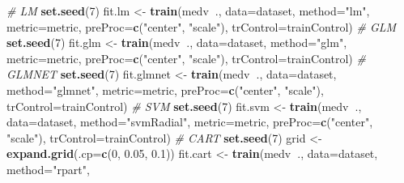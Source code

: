 \documentclass[]{book}
\newenvironment{Shaded}{\begin{snugshade}}{\end{snugshade}}
\newcommand{\CommentTok}[1]{\textcolor[rgb]{0.56,0.35,0.01}{\textit{#1}}}
\newcommand{\DataTypeTok}[1]{\textcolor[rgb]{0.13,0.29,0.53}{#1}}
\newcommand{\DecValTok}[1]{\textcolor[rgb]{0.00,0.00,0.81}{#1}}
\newcommand{\FloatTok}[1]{\textcolor[rgb]{0.00,0.00,0.81}{#1}}
\newcommand{\KeywordTok}[1]{\textcolor[rgb]{0.13,0.29,0.53}{\textbf{#1}}}
\newcommand{\NormalTok}[1]{#1}
\newcommand{\OperatorTok}[1]{\textcolor[rgb]{0.81,0.36,0.00}{\textbf{#1}}}
\newcommand{\StringTok}[1]{\textcolor[rgb]{0.31,0.60,0.02}{#1}}
\begin{document}
\begin{Shaded}
\begin{Highlighting}[]
\CommentTok{# LM}
\KeywordTok{set.seed}\NormalTok{(}\DecValTok{7}\NormalTok{)}
\NormalTok{fit.lm <-}\StringTok{ }\KeywordTok{train}\NormalTok{(medv}\OperatorTok{~}\NormalTok{., }\DataTypeTok{data=}\NormalTok{dataset, }\DataTypeTok{method=}\StringTok{"lm"}\NormalTok{, }
                \DataTypeTok{metric=}\NormalTok{metric, }\DataTypeTok{preProc=}\KeywordTok{c}\NormalTok{(}\StringTok{"center"}\NormalTok{, }\StringTok{"scale"}\NormalTok{), }
                \DataTypeTok{trControl=}\NormalTok{trainControl)}
\CommentTok{# GLM}
\KeywordTok{set.seed}\NormalTok{(}\DecValTok{7}\NormalTok{)}
\NormalTok{fit.glm <-}\StringTok{ }\KeywordTok{train}\NormalTok{(medv}\OperatorTok{~}\NormalTok{., }\DataTypeTok{data=}\NormalTok{dataset, }\DataTypeTok{method=}\StringTok{"glm"}\NormalTok{, }
                 \DataTypeTok{metric=}\NormalTok{metric, }\DataTypeTok{preProc=}\KeywordTok{c}\NormalTok{(}\StringTok{"center"}\NormalTok{, }\StringTok{"scale"}\NormalTok{), }
                 \DataTypeTok{trControl=}\NormalTok{trainControl)}
\CommentTok{# GLMNET}
\KeywordTok{set.seed}\NormalTok{(}\DecValTok{7}\NormalTok{)}
\NormalTok{fit.glmnet <-}\StringTok{ }\KeywordTok{train}\NormalTok{(medv}\OperatorTok{~}\NormalTok{., }\DataTypeTok{data=}\NormalTok{dataset, }\DataTypeTok{method=}\StringTok{"glmnet"}\NormalTok{, }
                    \DataTypeTok{metric=}\NormalTok{metric, }
                    \DataTypeTok{preProc=}\KeywordTok{c}\NormalTok{(}\StringTok{"center"}\NormalTok{, }\StringTok{"scale"}\NormalTok{), }
                    \DataTypeTok{trControl=}\NormalTok{trainControl)}
\CommentTok{# SVM}
\KeywordTok{set.seed}\NormalTok{(}\DecValTok{7}\NormalTok{)}
\NormalTok{fit.svm <-}\StringTok{ }\KeywordTok{train}\NormalTok{(medv}\OperatorTok{~}\NormalTok{., }\DataTypeTok{data=}\NormalTok{dataset, }\DataTypeTok{method=}\StringTok{"svmRadial"}\NormalTok{, }
                 \DataTypeTok{metric=}\NormalTok{metric, }
                 \DataTypeTok{preProc=}\KeywordTok{c}\NormalTok{(}\StringTok{"center"}\NormalTok{, }\StringTok{"scale"}\NormalTok{), }
                 \DataTypeTok{trControl=}\NormalTok{trainControl)}
\CommentTok{# CART}
\KeywordTok{set.seed}\NormalTok{(}\DecValTok{7}\NormalTok{)}
\NormalTok{grid <-}\StringTok{ }\KeywordTok{expand.grid}\NormalTok{(}\DataTypeTok{.cp=}\KeywordTok{c}\NormalTok{(}\DecValTok{0}\NormalTok{, }\FloatTok{0.05}\NormalTok{, }\FloatTok{0.1}\NormalTok{))}
\NormalTok{fit.cart <-}\StringTok{ }\KeywordTok{train}\NormalTok{(medv}\OperatorTok{~}\NormalTok{., }\DataTypeTok{data=}\NormalTok{dataset, }\DataTypeTok{method=}\StringTok{"rpart"}\NormalTok{, }

\end{Highlighting}
\end{Shaded}
\end{document}
